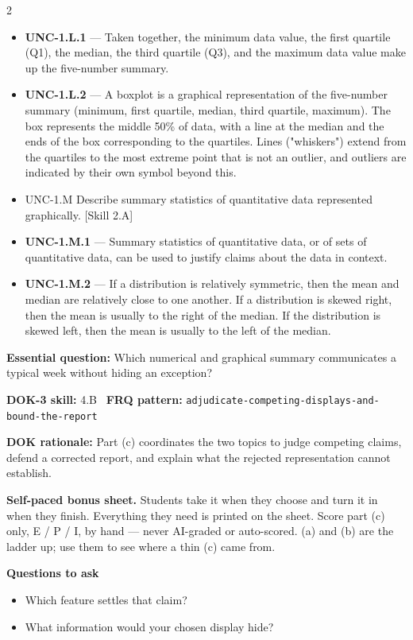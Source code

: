 \documentclass[11pt]{article}
\begin{document}
\begin{multicols}{2}
{\begin{itemize}[leftmargin=*,itemsep=0pt,topsep=0pt]
\item \textbf{UNC-1.L.1} --- Taken together, the minimum data value, the first quartile (Q1), the median, the third quartile (Q3), and the maximum data value make up the five-number summary.
\item \textbf{UNC-1.L.2} --- A boxplot is a graphical representation of the five-number summary (minimum, first quartile, median, third quartile, maximum). The box represents the middle 50\% of data, with a line at the median and the ends of the box corresponding to the quartiles. Lines ("whiskers") extend from the quartiles to the most extreme point that is not an outlier, and outliers are indicated by their own symbol beyond this.
\item UNC-1.M Describe summary statistics of quantitative data represented graphically. [Skill 2.A]
\item \textbf{UNC-1.M.1} --- Summary statistics of quantitative data, or of sets of quantitative data, can be used to justify claims about the data in context.
\item \textbf{UNC-1.M.2} --- If a distribution is relatively symmetric, then the mean and median are relatively close to one another. If a distribution is skewed right, then the mean is usually to the right of the median. If the distribution is skewed left, then the mean is usually to the left of the median.
\end{itemize}}
\end{multicols}
\clearpage
\small
\textbf{Essential question:} Which numerical and graphical summary communicates a typical week without hiding an exception?\par
\textbf{DOK-3 skill:} 4.B \textperiodcentered\ \textbf{FRQ pattern:} {\small\texttt{adjudicate-\allowbreak{}competing-\allowbreak{}displays-\allowbreak{}and-\allowbreak{}bound-\allowbreak{}the-\allowbreak{}report}}\par
\textbf{DOK rationale:} Part (c) coordinates the two topics to judge competing claims, defend a corrected report, and explain what the rejected representation cannot establish.\par

\textbf{Self-paced bonus sheet.} Students take it when they choose and turn it in when they finish. Everything they need is printed on the sheet. Score part (c) only, E / P / I, by hand --- never AI-graded or auto-scored. (a) and (b) are the ladder up; use them to see where a thin (c) came from.\par

\textbf{Questions to ask}
\begin{itemize}[leftmargin=1.5em,itemsep=2pt,topsep=2pt]
  \item Which feature settles that claim?
  \item What information would your chosen display hide?
\end{itemize}
\end{document}
